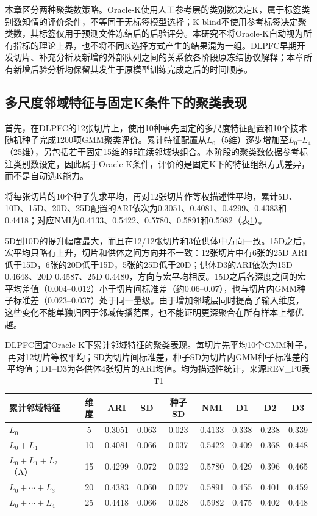 本章区分两种聚类数策略。Oracle-K使用人工参考层的类别数决定K，属于标签类别数知情的评价条件，不等同于无标签模型选择；K-blind不使用参考标签决定聚类数，其标签仅用于预测文件冻结后的后验评分。本研究不将Oracle-K自动视为所有指标的理论上界，也不将不同K选择方式产生的结果混为一组。DLPFC早期开发切片、补充分析及新增的外部队列之间的关系依各阶段原冻结协议解释；本章所有新增后验分析均保留其发生于原模型训练完成之后的时间顺序。

\subsection{多尺度邻域特征与固定K条件下的聚类表现}
\label{subsec:cellcharter-e1e2-v1}

首先，在DLPFC的12张切片上，使用10种事先固定的多尺度特征配置和10个技术随机种子完成1200项GMM聚类评价。累计特征配置从$L_0$（5维）逐步增加至$L_0$--$L_4$（25维），另包括若干固定15维的非连续邻域块组合。本阶段的聚类数依据参考标注类别数设定，因此属于Oracle-K条件，评价的是固定K下的特征组织方式差异，而不是自动选K能力。

将每张切片的10个种子先求平均，再对12张切片作等权描述性平均，累计5D、10D、15D、20D、25D配置的ARI依次为0.3051、0.4081、0.4299、0.4383和0.4418；对应NMI为0.4133、0.5422、0.5780、0.5891和0.5982（表\ref{tab:cellcharter-e1e2-depth-v1}）。

5D到10D的提升幅度最大，而且在12/12张切片和3位供体中方向一致。15D之后，宏平均只略有上升，切片和供体之间方向并不一致：12张切片中有6张的25D ARI低于15D，6张的20D低于15D，5张的25D低于20D；供体D3的ARI依次为15D 0.4648、20D 0.4587、25D 0.4480，方向与宏平均相反。15D之后各深度之间的宏平均差值（0.004--0.012）小于切片间标准差（约0.06--0.07），也与切片内GMM种子标准差（0.023--0.037）处于同一量级。由于增加邻域层同时提高了输入维度，这些变化不能单独归因于邻域传播范围，也不能证明更深聚合在所有样本上都优越。

\begin{table}[htbp]
\centering
\caption{DLPFC固定Oracle-K下累计邻域特征的聚类表现。每切片先平均10个GMM种子，再对12切片等权平均；SD为切片间标准差，种子SD为切片内GMM种子标准差的平均值；D1--D3为各供体4张切片的ARI均值。均为描述性统计，来源REV\_P0表T1}
\label{tab:cellcharter-e1e2-depth-v1}
\small
\begin{tabular}{lcccccccc}
\toprule
累计邻域特征 & 维度 & ARI & SD & 种子SD & NMI & D1 & D2 & D3\\
\midrule
$L_0$ & 5 & 0.3051 & 0.063 & 0.023 & 0.4133 & 0.338 & 0.238 & 0.339\\
$L_0+L_1$ & 10 & 0.4081 & 0.066 & 0.037 & 0.5422 & 0.409 & 0.368 & 0.448\\
$L_0+L_1+L_2$（A） & 15 & 0.4299 & 0.072 & 0.032 & 0.5780 & 0.429 & 0.396 & 0.465\\
$L_0+\cdots+L_3$ & 20 & 0.4383 & 0.060 & 0.027 & 0.5891 & 0.455 & 0.401 & 0.459\\
$L_0+\cdots+L_4$ & 25 & 0.4418 & 0.066 & 0.028 & 0.5982 & 0.475 & 0.402 & 0.448\\
\bottomrule
\end{tabular}
\end{table}

